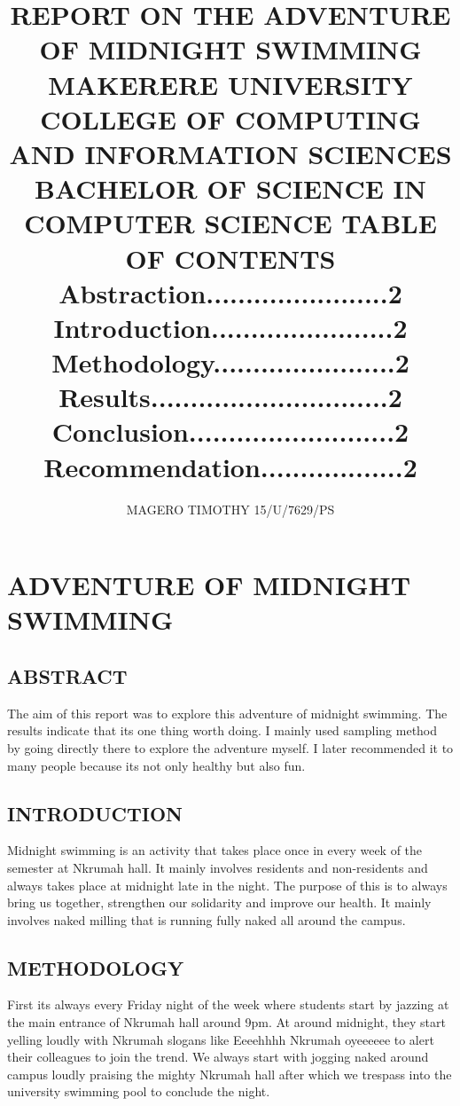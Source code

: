\documentclass[10pt]{report}
\begin{document}
\title{
{ REPORT ON THE ADVENTURE OF MIDNIGHT SWIMMING}\\
{\large MAKERERE UNIVERSITY}\\
{\large COLLEGE OF COMPUTING AND INFORMATION SCIENCES}
{\large BACHELOR OF SCIENCE IN COMPUTER SCIENCE}
{TABLE OF CONTENTS}\\
{\large Abstraction.......................2}\\
{\large Introduction.......................2}\\
{\large Methodology.......................2}\\
{\large Results..............................2}\\
{\large Conclusion..........................2}\\
{\large Recommendation..................2}}
\author{
{MAGERO TIMOTHY}
{15/U/7629/PS}}
\maketitle


\section{ADVENTURE OF MIDNIGHT SWIMMING}
\subsection{ABSTRACT}
{The aim of this report was to explore this adventure of midnight swimming. The results indicate that its one thing worth doing. I mainly used sampling method by going directly there to explore the adventure myself. I later recommended it to many people because its not only healthy but also fun.}
\subsection{INTRODUCTION}
{Midnight swimming is an activity that takes place once in every week of the semester at Nkrumah hall. It mainly involves residents and non-residents and always takes place at midnight late in the night. The purpose of this is to always bring us together, strengthen our solidarity and improve our health. It mainly involves naked milling that is running fully naked all around the campus.}
\subsection{METHODOLOGY}
{First its always every Friday night of the week where students start by jazzing at the main entrance of Nkrumah hall around 9pm. At around midnight, they start yelling loudly with Nkrumah slogans like Eeeehhhh Nkrumah oyeeeeee to alert their colleagues to join the trend. 
We always start with jogging naked around campus loudly praising the mighty Nkrumah hall after which we trespass into the university swimming pool to conclude the night. }
\end{document}
